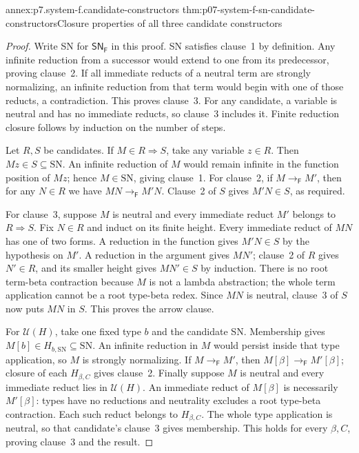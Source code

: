 \begin{annexitem}{annex:p7.system-f.candidate-constructors}
 {thm:p07-system-f-sn-candidate-constructors}{Closure properties of all three candidate constructors}
\begin{proof}
Write SN for \(\mathsf{SN}_{\mathsf F}\) in this proof. SN satisfies
clause~1 by definition. Any infinite reduction from a successor would
extend to one from its predecessor, proving clause~2. If all immediate
reducts of a neutral term are strongly normalizing, an infinite reduction
from that term would begin with one of those reducts, a contradiction.
This proves clause~3. For any candidate, a variable is neutral and has
no immediate reducts, so clause~3 includes it. Finite reduction closure
follows by induction on the number of steps.

Let \(R,S\) be candidates. If \(M\in R\Rightarrow S\), take any
variable \(z\in R\). Then \(Mz\in S\subseteq\mathrm{SN}\).
An infinite reduction of \(M\) would remain infinite in the function
position of \(Mz\); hence \(M\in\mathrm{SN}\), giving clause~1.
For clause~2, if \(M\to_{\mathsf F}M'\), then for any \(N\in R\)
we have \(MN\to_{\mathsf F}M'N\). Clause~2 of \(S\) gives
\(M'N\in S\), as required.

For clause~3, suppose \(M\) is neutral and every immediate reduct
\(M'\) belongs to \(R\Rightarrow S\). Fix \(N\in R\) and induct
on its finite height. Every immediate reduct of \(MN\) has one of two
forms. A reduction in the function gives \(M'N\in S\) by the
hypothesis on \(M'\). A reduction in the argument gives \(MN'\);
clause~2 of \(R\) gives \(N'\in R\), and its smaller height gives
\(MN'\in S\) by induction. There is no root term-beta contraction
because \(M\) is not a lambda abstraction; the whole term application
cannot be a root type-beta redex. Since \(MN\) is neutral, clause~3
of \(S\) now puts \(MN\) in \(S\). This proves the arrow clause.

For \(\mathcal U(H)\), take one fixed type \(b\) and the candidate
SN. Membership gives \(M[b]\in H_{b,\mathrm{SN}}\subseteq\mathrm{SN}\).
An infinite reduction in \(M\) would persist inside that type application,
so \(M\) is strongly normalizing. If \(M\to_{\mathsf F}M'\), then
\(M[\beta]\to_{\mathsf F}M'[\beta]\); closure of each
\(H_{\beta,C}\) gives clause~2. Finally suppose \(M\) is neutral
and every immediate reduct lies in \(\mathcal U(H)\). An immediate
reduct of \(M[\beta]\) is necessarily \(M'[\beta]\): types have
no reductions and neutrality excludes a root type-beta contraction.
Each such reduct belongs to \(H_{\beta,C}\). The whole type
application is neutral, so that candidate's clause~3 gives membership.
This holds for every \(\beta,C\), proving clause~3 and the result.
\end{proof}
\end{annexitem}

